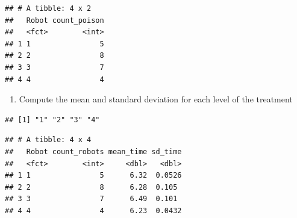 \documentclass[]{book}
\newenvironment{Shaded}{\begin{snugshade}}{\end{snugshade}}
\newcommand{\CommentTok}[1]{\textcolor[rgb]{0.56,0.35,0.01}{\textit{#1}}}
\newcommand{\DataTypeTok}[1]{\textcolor[rgb]{0.13,0.29,0.53}{#1}}
\newcommand{\KeywordTok}[1]{\textcolor[rgb]{0.13,0.29,0.53}{\textbf{#1}}}
\newcommand{\NormalTok}[1]{#1}
\newcommand{\OperatorTok}[1]{\textcolor[rgb]{0.81,0.36,0.00}{\textbf{#1}}}
\newcommand{\OtherTok}[1]{\textcolor[rgb]{0.56,0.35,0.01}{#1}}
\newcommand{\StringTok}[1]{\textcolor[rgb]{0.31,0.60,0.02}{#1}}
\providecommand{\tightlist}{%
  \setlength{\itemsep}{0pt}\setlength{\parskip}{0pt}}
\begin{document}
\begin{verbatim}
## # A tibble: 4 x 2
##   Robot count_poison
##   <fct>        <int>
## 1 1                5
## 2 2                8
## 3 3                7
## 4 4                4
\end{verbatim}

\begin{enumerate}
\def\labelenumi{\arabic{enumi}.}
\setcounter{enumi}{3}
\tightlist
\item
  Compute the mean and standard deviation for each level of the treatment
\end{enumerate}

\begin{Shaded}
\end{Shaded}

\begin{verbatim}
## [1] "1" "2" "3" "4"
\end{verbatim}

\begin{Shaded}
\end{Shaded}

\begin{verbatim}
## # A tibble: 4 x 4
##   Robot count_robots mean_time sd_time
##   <fct>        <int>     <dbl>   <dbl>
## 1 1                5      6.32  0.0526
## 2 2                8      6.28  0.105 
## 3 3                7      6.49  0.101 
## 4 4                4      6.23  0.0432
\end{verbatim}
\end{document}
